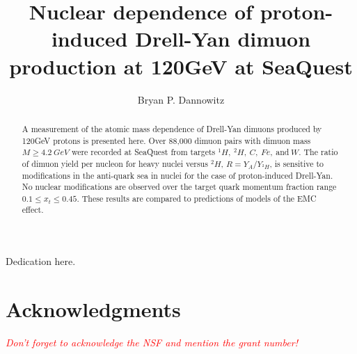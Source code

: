 \documentclass[edeposit,fullpage]{uiucthesis2009}
\newcommand{\red}[1]{\emph{\textcolor{red}{#1}}}
\begin{document}
\title{Nuclear dependence of proton-induced Drell-Yan dimuon production at 120GeV at SeaQuest}
\author{Bryan P. Dannowitz}
\phdthesis
{}
\maketitle

\frontmatter

\begin{abstract}
A measurement of the atomic mass dependence of Drell-Yan dimuons produced by 120GeV protons
is presented here. Over 88,000 dimuon pairs with dimuon mass $M \geq 4.2\ GeV$ were recorded at 
SeaQuest from targets $^1H,\ ^2H,\ C,\ Fe,\ $and$\ W$. The ratio of dimuon yield per nucleon for 
heavy nuclei versus $^2H$, $R = Y_A / Y_{^2H}$, is sensitive to modifications in the anti-quark
sea in nuclei for the case of proton-induced Drell-Yan. No nuclear modifications are observed
over the target quark momentum fraction range $0.1 \leq x_t \leq 0.45$. These results are
compared to predictions of models of the EMC effect.
\end{abstract}


\begin{dedication}
Dedication here.
\end{dedication}

\chapter*{Acknowledgments}

\red{Don't forget to acknowledge the NSF and mention the grant number!}

\end{document}

